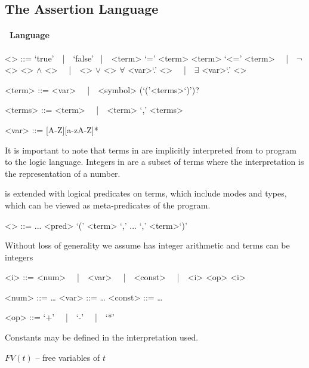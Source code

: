 \subsection{The Assertion Language}

\paragraph{\Cond\ Language}

\setlength{\grammarparsep}{20pt plus 1pt minus 1pt} %
\setlength{\grammarindent}{5em} %

\begin{grammar}
<\Cond> ::= `true'\ \ |\ \ `false'
\ |\ \  <term> `=' <term> 
\alt  <term> `<=' <term>
\ \ |\ \  $\neg$ <\Cond>
\alt <\Cond> $\wedge$ <\Cond>
\ \ |\ \  <\Cond> $\vee$ <\Cond>
\alt  $\forall$ <var>`.' <\Cond>
\ \ |\ \  $\exists$ <var>`.' <\Cond>

<term> ::= <var> \ \ |\ \ <symbol> (`('<terms>`)')?

<terms> ::= <term> \ \ |\ \ <term> `,' <terms>


<var> ::= [A-Z][a-zA-Z]*
\end{grammar}


It is important to note that terms in \Cond{} are implicitly interpreted
from to program to the logic language.
%
Integers in \Cond{} are a subset of terms where the interpretation is
the representation of a number.


\Cond{} is extended with logical predicates on terms, which include modes
and types, which can be viewed as meta-predicates of the program.

\begin{grammar}
<\Cond> ::= ...
\alt  <pred> `(' <term> `,' ... `,' <term>`)'
\end{grammar}

Without loss of generality we assume \Cond{} has integer arithmetic and
terms can be integers

\begin{grammar}
<i> ::= <num>
\ \ |\ \ <var>
\ \ |\ \ <const>
\ \ |\ \ <i> <op> <i>

<num> ::= \dots
<var> ::= \dots
<const> ::= \dots

<op> ::= `+'
\ \ |\ \ `-'
\ \ |\ \ `*'
\end{grammar}

Constants may be defined in the interpretation used.


$FV(t)$ -- free variables of $t$

